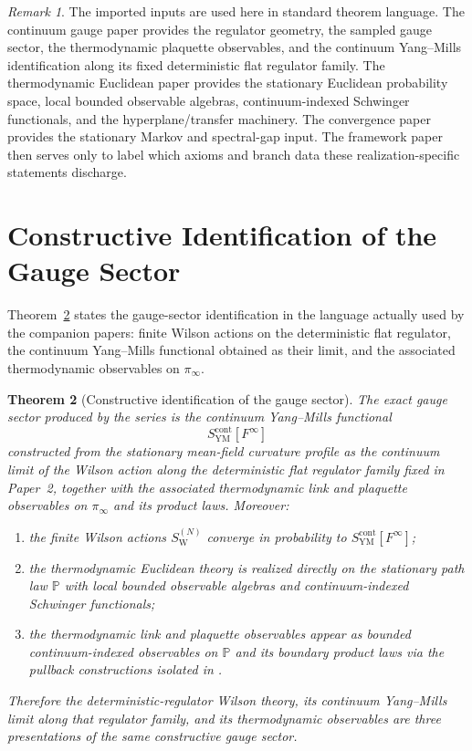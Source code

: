 \documentclass[11pt]{article}
\newtheorem{theorem}{Theorem}[section]
\theoremstyle{definition}
\theoremstyle{remark}
\newtheorem{remark}[theorem]{Remark}
\begin{document}
\begin{remark}
The imported inputs are used here in standard theorem language.
The continuum gauge paper provides the regulator geometry, the sampled gauge
sector, the thermodynamic plaquette observables, and the continuum
Yang--Mills identification along its fixed deterministic flat regulator
family.  The thermodynamic Euclidean paper provides the
stationary Euclidean probability space, local bounded observable algebras,
continuum-indexed Schwinger functionals, and the hyperplane/transfer
machinery.  The convergence paper provides the stationary Markov and
spectral-gap input.  The framework paper then serves only
to label which axioms and branch data these realization-specific statements
discharge.
\end{remark}

\section{Constructive Identification of the Gauge Sector}
\label{sec:identification}

Theorem~\ref{thm:constructive-identification} states the gauge-sector
identification in the language actually used by the companion papers: finite
Wilson actions on the deterministic flat regulator, the continuum Yang--Mills
functional obtained as their limit, and the associated thermodynamic
observables on $\pi_\infty$.

\begin{theorem}[Constructive identification of the gauge sector]
\label{thm:constructive-identification}
The exact gauge sector produced by the series is the continuum Yang--Mills
functional
\[
S_{\mathrm{YM}}^{\mathrm{cont}}[F^\infty]
\]
constructed from the stationary mean-field curvature profile as the continuum
limit of the Wilson action along the deterministic flat regulator family fixed
in Paper~2, together with the associated thermodynamic link and plaquette
observables on $\pi_\infty$ and its product laws.
Moreover:
\begin{enumerate}[label=\textnormal{(\roman*)},leftmargin=1.5em]
\item the finite Wilson actions $S_{\mathrm W}^{(N)}$ converge in probability to
$S_{\mathrm{YM}}^{\mathrm{cont}}[F^\infty]$;
\item the thermodynamic Euclidean theory is realized directly on the stationary
path law $\mathbb P$ with local bounded observable algebras and
continuum-indexed Schwinger functionals;
\item the thermodynamic link and plaquette observables appear as bounded
continuum-indexed observables on $\mathbb P$ and its boundary product laws via
the pullback constructions isolated in \cite{quantization}.
\end{enumerate}
Therefore the deterministic-regulator Wilson theory, its continuum
Yang--Mills limit along that regulator family, and its thermodynamic
observables are three presentations of
the same constructive gauge sector.
\end{theorem}
\end{document}
